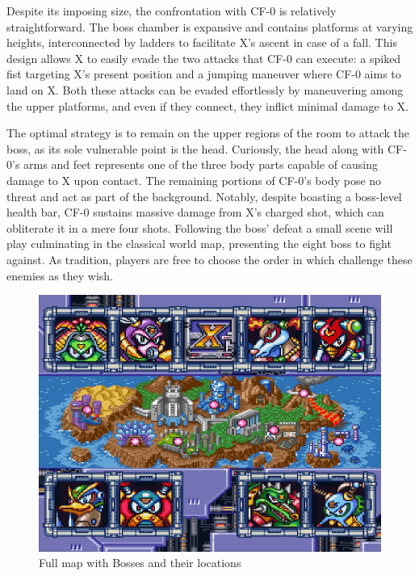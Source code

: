 Despite its imposing size, the confrontation with CF-0 is relatively straightforward. The boss chamber is expansive and contains platforms at varying heights, interconnected by ladders to facilitate X's ascent in case of a fall. This design allows X to easily evade the two attacks that CF-0 can execute: a spiked fist targeting X's present position and a jumping maneuver where CF-0 aims to land on X. Both these attacks can be evaded effortlessly by maneuvering among the upper platforms, and even if they connect, they inflict minimal damage to X.

The optimal strategy is to remain on the upper regions of the room to attack the boss, as its sole vulnerable point is the head. Curiously, the head along with CF-0's arms and feet represents one of the three body parts capable of causing damage to X upon contact. The remaining portions of CF-0's body pose no threat and act as part of the background. Notably, despite boasting a boss-level health bar, CF-0 sustains massive damage from X's charged shot, which can obliterate it in a mere four shots. Following the boss' defeat a small scene will play culminating in the classical world map, presenting the eight boss to fight against. As tradition, players are free to choose the order in which challenge these enemies as they wish.

\begin{figure}[htp]
	\centering
	\includegraphics[width=0.5\linewidth]{figures/X2/map.png}
	\caption{Full map with Bosses and their locations}
\end{figure}


